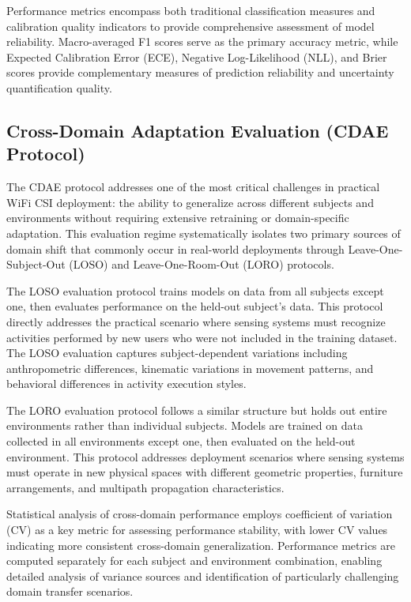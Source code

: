 \documentclass[journal]{IEEEtran}
\begin{document}
Performance metrics encompass both traditional classification measures and calibration quality indicators to provide comprehensive assessment of model reliability. Macro-averaged F1 scores serve as the primary accuracy metric, while Expected Calibration Error (ECE), Negative Log-Likelihood (NLL), and Brier scores provide complementary measures of prediction reliability and uncertainty quantification quality.

\subsection{Cross-Domain Adaptation Evaluation (CDAE Protocol)}

The CDAE protocol addresses one of the most critical challenges in practical WiFi CSI deployment: the ability to generalize across different subjects and environments without requiring extensive retraining or domain-specific adaptation. This evaluation regime systematically isolates two primary sources of domain shift that commonly occur in real-world deployments through Leave-One-Subject-Out (LOSO) and Leave-One-Room-Out (LORO) protocols.

The LOSO evaluation protocol trains models on data from all subjects except one, then evaluates performance on the held-out subject's data. This protocol directly addresses the practical scenario where sensing systems must recognize activities performed by new users who were not included in the training dataset. The LOSO evaluation captures subject-dependent variations including anthropometric differences, kinematic variations in movement patterns, and behavioral differences in activity execution styles.

The LORO evaluation protocol follows a similar structure but holds out entire environments rather than individual subjects. Models are trained on data collected in all environments except one, then evaluated on the held-out environment. This protocol addresses deployment scenarios where sensing systems must operate in new physical spaces with different geometric properties, furniture arrangements, and multipath propagation characteristics.

Statistical analysis of cross-domain performance employs coefficient of variation (CV) as a key metric for assessing performance stability, with lower CV values indicating more consistent cross-domain generalization. Performance metrics are computed separately for each subject and environment combination, enabling detailed analysis of variance sources and identification of particularly challenging domain transfer scenarios.
\end{document}
